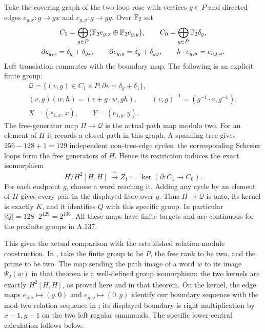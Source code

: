 Take the covering graph of the two-loop rose with
vertices $g\in P$ and directed edges
$e_{g,x}:g\to gx$ and $e_{g,y}:g\to gy$.
Over $\mathbb F_2$ set
\[
 \begin{gathered}
 C_1=\bigoplus_{g\in P}\bigl(\mathbb F_2e_{g,x}\oplus\mathbb F_2e_{g,y}\bigr),
       \qquad C_0=\bigoplus_{g\in P}\mathbb F_2\delta_g,\\
 \partial e_{g,x}=\delta_g+\delta_{gx},\qquad
 \partial e_{g,y}=\delta_g+\delta_{gy},\qquad
             h\cdot e_{g,u}=e_{hg,u}.
 \end{gathered}
\]
Left translation commutes with the boundary map.
The following is an explicit finite group:
\[
 \begin{gathered}
 \mathcal Q=\{(v,g)\in C_1\times P:
                          \partial v=\delta_g+\delta_1\},\\
 (v,g)(w,h)=(v+g\cdot w,gh),\qquad
                  (v,g)^{-1}=(g^{-1}\cdot v,g^{-1}),\\
                   X=(e_{1,x},x),\qquad Y=(e_{1,y},y).
 \end{gathered}
\]
The free-generator map $\Pi\to\mathcal Q$ is
the actual path map modulo two.
For an element of $H$ it records a closed path
in this graph.
A spanning tree gives $256-128+1=129$ independent
non-tree-edge cycles; the corresponding Schreier
loops form the free generators of $H$.
Hence its restriction induces the exact isomorphism
\[
        H/\overline{H^2[H,H]}\ \xrightarrow{\ \sim\ }
                       Z_1:=\ker(\partial:C_1\to C_0).
\]
For each endpoint $g$, choose a word reaching it.
Adding any cycle by an element of $H$ gives every
pair in the displayed fibre over $g$.
Thus $\Pi\to\mathcal Q$ is onto, its kernel is
exactly $K$, and it identifies $Q$ with this
specific group.
In particular $|Q|=128\cdot2^{129}=2^{136}$.
All these maps have finite targets and are
continuous for the profinite groups in A.137.

This gives the actual comparison with the established
relation-module construction.  In
\cite[Definition 2.1 and Theorem 3.7]{AgentDietrichHulpke2020},
take the finite group to be $P$, the free rank to be two,
and the prime to be two.  The map sending the path image
of a word $w$ to its image $\Psi_2(w)$ in that theorem
is a well-defined group isomorphism: the two kernels
are exactly $\overline{H^2[H,H]}$, as proved here and
in that theorem.  On the kernel, the edge maps
$e_{g,x}\mapsto(g,0)$ and $e_{g,y}\mapsto(0,g)$
identify our boundary sequence with the mod-two
relation sequence in
\cite[Proposition 2.8]{AgentYamin1991}; its displayed
boundary is right multiplication by $x-1,y-1$ on
the two left regular summands.
The specific lower-central calculation follows below.


